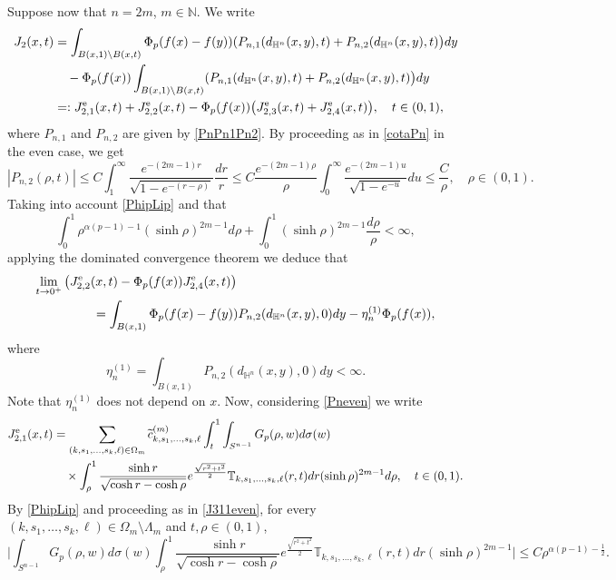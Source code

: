 \documentclass[a4paper,10pt, reqno]{amsart}
\theoremstyle{definition}
\theoremstyle{remark}
\numberwithin{equation}{section}
\begin{document}
{Suppose now that $n=2m$, $m\in \mathbb N$. We write
\begin{align}\label{J2even}
J_2(x,t)&=\int_{B(x,1)\setminus B(x,t)}\Phi_p(f(x)-f(y))(P_{n,1}(d_{\mathbb H^n}(x,y),t)
+P_{n,2}(d_{\mathbb H^n}(x,y),t)\big)dy\nonumber\\
&\quad -\Phi _p(f(x))\int_{B(x,1)\setminus B(x,t)}(P_{n,1}(d_{\mathbb H^n}(x,y),t)
+P_{n,2}(d_{\mathbb H^n}(x,y),t)\big)dy\nonumber\\
&=:J_{2,1}^{\rm e}(x,t)+J_{2,2}^{\rm e}(x,t)-\Phi _p(f(x))\big(J_{2,3}^{\rm e}(x,t)+J_{2,4}^{\rm e}(x,t)\big),\quad t\in (0,1),
\end{align}
where $P_{n,1}$ and $P_{n,2}$ are given by \eqref{PnPn1Pn2}. By proceeding as in \eqref{cotaPn} in the even case, we get 
$$
|P_{n,2}(\rho , t)|\leq C\int_1^\infty \frac{e^{-(2m-1)r}}{\sqrt{1-e^{-(r-\rho )}}}\frac{dr}{r}\leq C\frac{e^{-(2m-1)\rho}}{\rho}\int_0^\infty\frac{e^{-(2m-1)u}}{\sqrt{1-e^{-u}}}du\leq \frac{C}{\rho},\quad \rho \in (0,1).
$$
Taking into account \eqref{PhipLip} and that 
$$
\int_0^1\rho ^{\alpha (p-1)-1}(\sinh\rho )^{2m-1}d\rho +\int_0^1(\sinh \rho )^{2m-1}\frac{d\rho}{\rho}<\infty,
$$
applying the dominated convergence theorem we deduce that
\begin{align}\label{J22J24even}
\lim_{t\rightarrow 0^+}\big(J_{2,2}^{\rm e}(x,t)-\Phi _p(f(x))J_{2,4}^{\rm e}(x,t)\big)&\nonumber\\
&\hspace{-4cm}=\int_{B(x,1)}\Phi_p(f(x)-f(y))P_{n,2}(d_{\mathbb H^n}(x,y),0)dy-\eta_n^{(1)}\Phi _p(f(x)),
\end{align}
where
$$
\eta_n^{(1)}=\int_{B(x,1)}P_{n,2}(d_{\mathbb H^n}(x,y),0)dy<\infty .
$$
Note that $\eta_n^{(1)}$ does not depend on $x$. Now, considering \eqref{Pneven} we write
\begin{align*}
J_{2,1}^{\rm e}(x,t)&=\sum_{(k,s_1,\ldots,s_k,\ell)\in \Omega_m}\widetilde{c}_{k,s_1,\ldots, s_k,\ell}^{(m)}\int_t^1\int_{S^{n-1}}G_p(\rho , w)d\sigma(w)\\
&\quad \times\int_\rho ^1\frac{\sinh r}{\sqrt{\cosh r -\cosh \rho}}e^{\frac{\sqrt{r^2+t^2}}{2}}\mathbb T_{k,s_1,\ldots,s_k,\ell}(r, t)dr(\sinh \rho )^{2m-1}d\rho,\quad t\in (0,1).
\end{align*}
By \eqref{PhipLip} and proceeding as in \eqref{J311even}, for every $(k,s_1,\ldots,s_k,\ell)\in \Omega_m\setminus\Lambda _m$ and  $t, \rho \in (0,1)$,
\begin{equation}\label{rho12}
\Big|\int_{S^{n-1}}G_p(\rho , w)d\sigma(w)\int_\rho ^1\frac{\sinh r}{\sqrt{\cosh r -\cosh \rho}}e^{\frac{\sqrt{r^2+t^2}}{2}}\mathbb T_{k,s_1,\ldots,s_k,\ell}(r, t)dr(\sinh \rho )^{2m-1}\Big|\leq C\rho^{\alpha (p-1)-\frac{1}{2}}.

\end{equation}}
\end{document}
